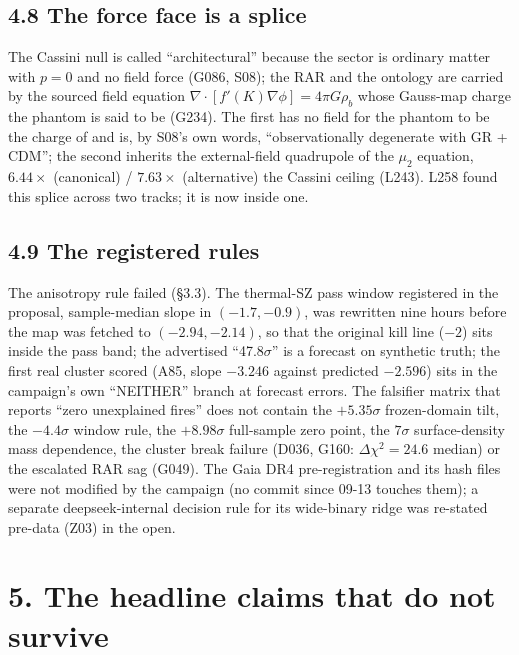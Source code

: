 \documentclass[
  11pt,
]{article}
\begin{document}
\subsection{4.8 The force face is a
splice}\label{the-force-face-is-a-splice}

The Cassini null is called ``architectural'' because the sector is
ordinary matter with \(p = 0\) and no field force (G086, S08); the RAR
and the ontology are carried by the sourced field equation
\(\nabla\!\cdot[f'(K)\nabla\phi] = 4\pi G\rho_b\) whose Gauss-map charge
the phantom is said to be (G234). The first has no field for the phantom
to be the charge of and is, by S08's own words, ``observationally
degenerate with GR + CDM''; the second inherits the external-field
quadrupole of the \(\mu_2\) equation, \(6.44\times\) (canonical) /
\(7.63\times\) (alternative) the Cassini ceiling (L243). L258 found this
splice across two tracks; it is now inside one.

\subsection{4.9 The registered rules}\label{the-registered-rules}

The anisotropy rule failed (§3.3). The thermal-SZ pass window registered
in the proposal, sample-median slope in \((-1.7, -0.9)\), was rewritten
nine hours before the map was fetched to \((-2.94, -2.14)\), so that the
original kill line (\(-2\)) sits inside the pass band; the advertised
``47.8\(\sigma\)'' is a forecast on synthetic truth; the first real
cluster scored (A85, slope \(-3.246\) against predicted \(-2.596\)) sits
in the campaign's own ``NEITHER'' branch at forecast errors. The
falsifier matrix that reports ``zero unexplained fires'' does not
contain the \(+5.35\sigma\) frozen-domain tilt, the \(-4.4\sigma\)
window rule, the \(+8.98\sigma\) full-sample zero point, the \(7\sigma\)
surface-density mass dependence, the cluster break failure (D036, G160:
\(\Delta\chi^2 = 24.6\) median) or the escalated RAR sag (G049). The
Gaia DR4 pre-registration and its hash files were not modified by the
campaign (no commit since 09-13 touches them); a separate
deepseek-internal decision rule for its wide-binary ridge was re-stated
pre-data (Z03) in the open.

\section{5. The headline claims that do not
survive}\label{the-headline-claims-that-do-not-survive}
\end{document}
